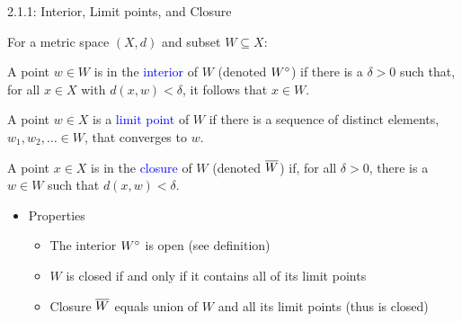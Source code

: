\documentclass[10pt,english]{beamer}
\begin{document}
\begin{frame}{2.1.1: Interior, Limit points, and Closure}

For a metric space $(X,d)$ and subset $W \subseteq X$:

\begin{definition}
A point $w\in W$ is in the \textcolor{blue}{interior} of $W$ (denoted ${W}^{\circ}$) if there is a $\delta >0$ such that, for all $x\in X$ with $d(x,w)<\delta$, it follows that $x\in W$.
\end{definition}

\begin{definition}
A point $w\in X$ is a \textcolor{blue}{limit point} of $W$ if there is a sequence of distinct elements, $w_1,w_2,\ldots\in W$, that converges to $w$.
\end{definition}

\begin{definition}
A point $x\in X$ is in the \textcolor{blue}{closure} of $W$ (denoted $\overline{W}$) if, for all $\delta >0$, there is a $w\in W$ such that $d(x,w)<\delta$.
\end{definition}

\begin{itemize}
\setlength\itemsep{3mm}
\item<1-> Properties \vspace{1mm}
\begin{itemize} 
  \setlength\itemsep{1.5mm}
  \item The interior ${W}^{\circ}$ is open (see definition)
  \item $W$ is closed if and only if it contains all of its limit points
  \item Closure $\overline{W}$ equals union of $W$ and all its limit points (thus is closed)
\end{itemize}
\end{itemize}

\end{frame}
\end{document}
